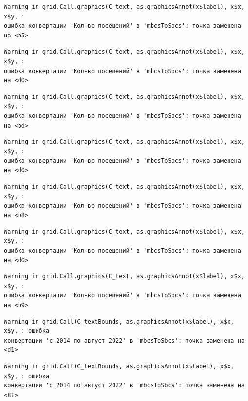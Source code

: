 \documentclass[
  letterpaper,
  DIV=11,
  numbers=noendperiod]{scrreprt}
\begin{document}
\begin{verbatim}
Warning in grid.Call.graphics(C_text, as.graphicsAnnot(x$label), x$x, x$y, :
ошибка конвертации 'Кол-во посещений' в 'mbcsToSbcs': точка заменена на <b5>
\end{verbatim}

\begin{verbatim}
Warning in grid.Call.graphics(C_text, as.graphicsAnnot(x$label), x$x, x$y, :
ошибка конвертации 'Кол-во посещений' в 'mbcsToSbcs': точка заменена на <d0>
\end{verbatim}

\begin{verbatim}
Warning in grid.Call.graphics(C_text, as.graphicsAnnot(x$label), x$x, x$y, :
ошибка конвертации 'Кол-во посещений' в 'mbcsToSbcs': точка заменена на <bd>
\end{verbatim}

\begin{verbatim}
Warning in grid.Call.graphics(C_text, as.graphicsAnnot(x$label), x$x, x$y, :
ошибка конвертации 'Кол-во посещений' в 'mbcsToSbcs': точка заменена на <d0>
\end{verbatim}

\begin{verbatim}
Warning in grid.Call.graphics(C_text, as.graphicsAnnot(x$label), x$x, x$y, :
ошибка конвертации 'Кол-во посещений' в 'mbcsToSbcs': точка заменена на <b8>
\end{verbatim}

\begin{verbatim}
Warning in grid.Call.graphics(C_text, as.graphicsAnnot(x$label), x$x, x$y, :
ошибка конвертации 'Кол-во посещений' в 'mbcsToSbcs': точка заменена на <d0>
\end{verbatim}

\begin{verbatim}
Warning in grid.Call.graphics(C_text, as.graphicsAnnot(x$label), x$x, x$y, :
ошибка конвертации 'Кол-во посещений' в 'mbcsToSbcs': точка заменена на <b9>
\end{verbatim}

\begin{verbatim}
Warning in grid.Call(C_textBounds, as.graphicsAnnot(x$label), x$x, x$y, : ошибка
конвертации 'с 2014 по август 2022' в 'mbcsToSbcs': точка заменена на <d1>
\end{verbatim}

\begin{verbatim}
Warning in grid.Call(C_textBounds, as.graphicsAnnot(x$label), x$x, x$y, : ошибка
конвертации 'с 2014 по август 2022' в 'mbcsToSbcs': точка заменена на <81>
\end{verbatim}
\end{document}
